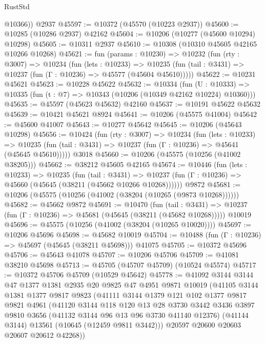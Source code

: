 \begin{lexlean}{RustStd}
\begin{coremodule}
        @10366))
    @2937
@45597 := @10372 (@45570 (@10223 @2937))
@45600 := @10285 (@10286 @2937) @42162
@45604 := @10206 (@10277 (@45600 @10294) @10298)
@45605 := @10311 @2937
@45610 := @10308 (@10310 @45605 @42165 @10266 @10268)
@45621 := fun (params : @10230) =>
  @10232
    (fun (rty : @3007) =>
    @10234
      (fun (lets : @10233) =>
      @10235 (fun (tail : @3431) => @10237 (fun (Γ : @10236) => @45577 (@45604 @45610)))))
@45622 := @10231 @45621
@45623 := @10228 @45622
@45632 := @10334
    (fun (U : @10333) => @10335 (fun (t : @7) => @10343 (@10206 (@10349 @42162 @10224) @10360)))
@45635 := @45597 (@45623 @45632) @42160
@45637 := @10191 @45622 @45632
@45639 := @10421 @45621 @8924
@45641 := @10206 (@45575 @41004)
@45642 := @45600 @41007
@45643 := @10277 @45642
@45645 := @10206 (@45643 @10298)
@45656 := @10424
    (fun (rty : @3007) =>
    @10234
      (fun (lets : @10233) =>
      @10235 (fun (tail : @3431) => @10237 (fun (Γ : @10236) => @45641 (@45645 @45610)))))
    @3018
@45660 := @10206 (@45575 (@10256 (@41002 @38205)))
@45662 := @38212 @45605 @42165
@45674 := @10446
    (fun (lets : @10233) =>
    @10235
      (fun (tail : @3431) =>
      @10237 (fun (Γ : @10236) => @45660 (@45645 (@38211 (@45662 @10266 @10268))))))
    @9872
@45681 := @10206 (@45575 (@10256 (@41002 (@38204 (@10265 (@9873 @10268))))))
@45682 := @45662 @9872
@45691 := @10470
    (fun (tail : @3431) => @10237 (fun (Γ : @10236) => @45681 (@45645 (@38211 (@45682 @10268)))))
    @10019
@45696 := @45575 (@10256 (@41002 (@38204 (@10265 @10020))))
@45697 := @10206 @45696
@45698 := @45682 @10019
@45704 := @10488 (fun (Γ : @10236) => @45697 (@45645 (@38211 @45698))) @41075
@45705 := @10372 @45696
@45706 := @45643 @41078
@45707 := @10206 @45706
@45709 := @41081 @38210 @45698
@45713 := @45705 (@45707 @45709) (@10524 @45574)
@45717 := @10372 @45706 @45709 (@10529 @45642)
@45778 := @41092
    @3144
    @3144
    @47
    @1377
    @1381
    @2935
    @20
    @9825
    @47
    @4951
    @9871
    @10019
    (@41105
      @3144
      @1381
      @1377
      @9817
      @9823
      (@41111
        @3144
        @1379
        @121
        @102
        @1377
        @9817
        @9821
        @4961
        (@41120
          @3144
          @118
          @120
          @13
          @28
          @3730
          @3442
          @3436
          @3897
          @9810
          @3656
          (@41132 @3144 @96 @13 @96 @3730 @41140 @12376)
          (@41144 @3144)
          @13561
          (@10645 (@12459 @9811 @3442)))
        @20597
        @20600
        @20603
        @20607
        @20612
        @42268))

\end{coremodule}
\end{lexlean}
